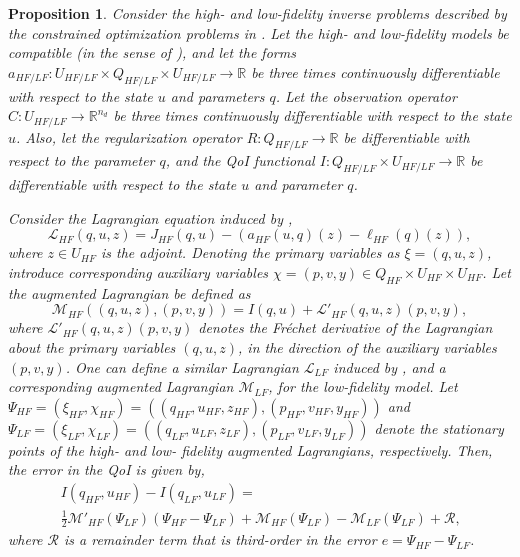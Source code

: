 \documentclass[review,sort&compress]{elsarticle}
\newcommand{\Reals}{{\mathbb{R}}}
\theoremstyle{plain} %
\newtheorem{proposition}{Proposition}
\theoremstyle{definition} %
\providecommand{\DIFaddtex}[1]{{\protect\color{blue} \sf #1}} %
\providecommand{\DIFaddbegin}{} %
\providecommand{\DIFaddend}{} %
\providecommand{\DIFadd}[1]{\texorpdfstring{\DIFaddtex{#1}}{#1}} %
\newcommand{\DIFaddincludegraphics}[2][]{{\color{blue}\fbox{\DIFOincludegraphics[#1]{#2}}}} %
\DeclareRobustCommand{\DIFaddbegin}{\DIFOaddbegin \let\includegraphics\DIFaddincludegraphics} %
\DeclareRobustCommand{\DIFaddend}{\DIFOaddend \let\includegraphics\DIFOincludegraphics} %
\begin{document}
\begin{proposition}
\label{thm:error_estimate}
Consider the high- and low-fidelity inverse problems described by the constrained optimization problems in . Let the \DIFaddbegin \DIFadd{high- and low-fidelity models be compatible (in the sense of \Cref{defn:comp}), and let the }\DIFaddend forms $a_{HF/LF}:U_{HF/LF} \times Q_{HF/LF} \times U_{HF/LF} \to \Reals$ be three times continuously differentiable with respect to the state $u$ and parameters $q$. Let the observation operator $C:U_{HF/LF}\to\Reals^{n_d}$ be three times continuously differentiable with respect to the state $u$. Also, let the regularization operator $R:Q_{HF/LF}\to\Reals$ be differentiable with respect to the parameter $q$, and the QoI functional $I:Q_{HF/LF}\times U_{HF/LF}\to\Reals$ be differentiable with respect to the state $u$ and parameter $q$.

Consider the Lagrangian equation induced by ,
%
\begin{equation}
\label{eq:InvsOpt_lag}
\mathcal{L}_{HF}(q,u,z)= J_{HF}(q,u)-(a_{HF}(u,q)(z)-\ell_{HF}(q)(z)),
\end{equation}
%
where $z\in U_{HF}$ is the adjoint. Denoting the primary variables as $\xi=(q,u,z)$, introduce corresponding auxiliary variables $\chi=(p,v,y)\in Q_{HF}\times U_{HF}\times U_{HF}$. Let the augmented Lagrangian be defined as
%
\begin{equation}
\label{eq:InvsOpt_auglag}
\mathcal{M}_{HF}((q,u,z),(p,v,y)) = I(q,u) + \mathcal{L}'_{HF}(q,u,z)(p,v,y),
\end{equation}
%
where $\mathcal{L}'_{HF}(q,u,z)(p,v,y)$ denotes the Fr\'{e}chet derivative of the Lagrangian about the primary variables $(q,u,z)$, in the direction of the auxiliary variables $(p,v,y)$. One can define a similar Lagrangian $\mathcal{L}_{LF}$ induced by , and a corresponding augmented Lagrangian $\mathcal{M}_{LF}$, for the low-fidelity model. Let $\Psi_{HF}= (\xi_{HF},\chi_{HF})=((q_{HF},u_{HF},z_{HF}),(p_{HF},v_{HF},y_{HF}))$ and $\Psi_{LF}= (\xi_{LF},\chi_{LF})=((q_{LF},u_{LF},z_{LF}),(p_{LF},v_{LF},y_{LF}))$ denote the stationary points of the high- and low- fidelity augmented Lagrangians, respectively. Then, the error in the QoI is given by,
%
\begin{multline}
\label{eq:semifinErrExp}
I(q_{HF},u_{HF})-I(q_{LF},u_{LF})=\\\frac{1}{2}\mathcal{M}'_{HF}(\Psi_{LF})(\Psi_{HF}-\Psi_{LF})+\mathcal{M}_{HF}(\Psi_{LF})-\mathcal{M}_{LF}(\Psi_{LF})+\mathcal{R}\textrm{,}
\end{multline}
%
where $\mathcal{R}$ is a remainder term that is third-order in the error $e=\Psi_{HF}-\Psi_{LF}$.
\end{proposition}
\end{document}
